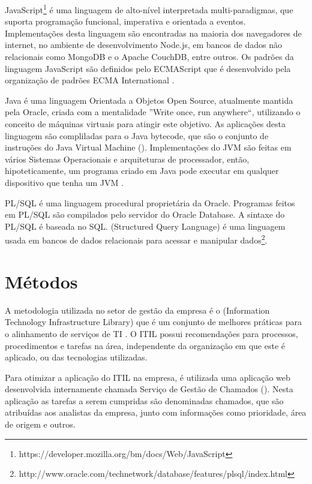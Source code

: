 JavaScript\footnote{https://developer.mozilla.org/bm/docs/Web/JavaScript} é uma linguagem de alto-nível interpretada multi-paradigmas, que suporta programação funcional, imperativa e orientada a eventos. Implementações desta linguagem são encontradas na maioria dos navegadores de internet, no ambiente de desenvolvimento Node.js, em bancos de dados não relacionais como MongoDB e o Apache CouchDB, entre outros. Os padrões da linguagem JavaScript são definidos pelo ECMAScript que é desenvolvido pela organização de padrões ECMA International \cite{js2019}.

Java é uma linguagem Orientada a Objetos Open Source, atualmente mantida pela Oracle, criada com a mentalidade ''Write once, run anywhere``, utilizando o conceito de máquinas virtuais para atingir este objetivo. As aplicações desta linguagem são compliladas para o Java bytecode, que são o conjunto de instruções do Java Virtual Machine (). Implementações do JVM são feitas em vários Sistemas Operacionais e arquiteturas de processador, então, hipoteticamente, um programa criado em Java pode executar em qualquer dispositivo que tenha um JVM \cite{java2019}.

PL/SQL é uma linguagem procedural proprietária da Oracle. Programas feitos em PL/SQL são compilados pelo servidor do Oracle Database. A sintaxe do PL/SQL é baseada no SQL.  (Structured Query Language) é uma linguagem usada em bancos de dados relacionais para acessar e manipular dados\footnote{http://www.oracle.com/technetwork/database/features/plsql/index.html}.

\section{Métodos}

A metodologia utilizada no setor de gestão da empresa é o  (Information Technology Infrastructure Library) que é um conjunto de melhores práticas para o alinhamento de serviços de TI  \cite{gallacher2012itil}. O ITIL possui recomendações para processos, procedimentos e tarefas na área, independente da organização em que este é aplicado, ou das tecnologias utilizadas. 

Para otimizar a aplicação do ITIL na empresa, é utilizada uma aplicação web desenvolvida internamente chamada Serviço de Gestão de Chamados (). Nesta aplicação as tarefas a serem cumpridas são denominadas chamados, que são atribuídas aos analistas da empresa, junto com informações como prioridade, área de origem e outros.



